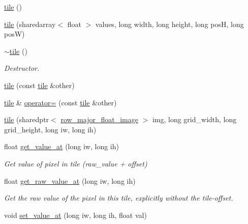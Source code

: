 \begin{DoxyCompactItemize}
\item 
\hyperlink{classtile_a294955b8c59ebef580775218e9df6f56}{tile} ()
\item 
\hyperlink{classtile_a9eb578c5a392a61165ed34c45c3b529f}{tile} (sharedarray$<$ float $>$ values, long width, long height, long pos\-H, long pos\-W)
\item 
\hypertarget{classtile_afbef14bff799cec1be0b2d504d66507b}{\hyperlink{classtile_afbef14bff799cec1be0b2d504d66507b}{$\sim$tile} ()}\label{classtile_afbef14bff799cec1be0b2d504d66507b}

\begin{DoxyCompactList}\small\item\em Destructor. \end{DoxyCompactList}\item 
\hyperlink{classtile_a989390f231f21621f98d2225dedea204}{tile} (const \hyperlink{classtile}{tile} \&other)
\item 
\hyperlink{classtile}{tile} \& \hyperlink{classtile_aefa643e1cf1b5d0805b02cfcc8c223ea}{operator=} (const \hyperlink{classtile}{tile} \&other)
\item 
\hyperlink{classtile_acda1ae264eae8604e3865178270bed66}{tile} (sharedptr$<$ \hyperlink{classrow__major__float__image}{row\-\_\-major\-\_\-float\-\_\-image} $>$ img, long grid\-\_\-width, long grid\-\_\-height, long iw, long ih)
\item 
\hypertarget{classtile_abffe6ab01bda427012726f7be95044f3}{float \hyperlink{classtile_abffe6ab01bda427012726f7be95044f3}{get\-\_\-value\-\_\-at} (long iw, long ih)}\label{classtile_abffe6ab01bda427012726f7be95044f3}

\begin{DoxyCompactList}\small\item\em Get value of pixel in tile (raw\-\_\-value + offset) \end{DoxyCompactList}\item 
\hypertarget{classtile_a28e6b8eaf4247af53a2193cdba8fc405}{float \hyperlink{classtile_a28e6b8eaf4247af53a2193cdba8fc405}{get\-\_\-raw\-\_\-value\-\_\-at} (long iw, long ih)}\label{classtile_a28e6b8eaf4247af53a2193cdba8fc405}

\begin{DoxyCompactList}\small\item\em Get the raw value of the pixel in this tile, explicitly without the tile-\/offset. \end{DoxyCompactList}\item 
\hypertarget{classtile_ae0a2a8b43ca654d1e35d4100d56ff1ba}{void \hyperlink{classtile_ae0a2a8b43ca654d1e35d4100d56ff1ba}{set\-\_\-value\-\_\-at} (long iw, long ih, float val)}\label{classtile_ae0a2a8b43ca654d1e35d4100d56ff1ba}


\end{DoxyCompactItemize}
